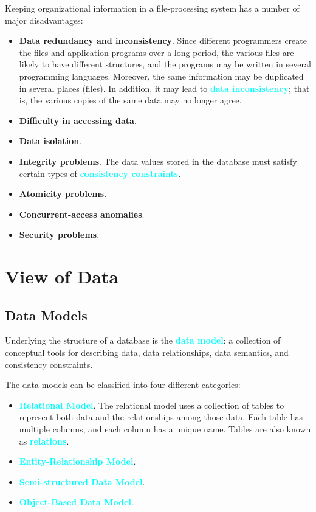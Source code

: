 \documentclass[a4paper,12pt,twoside,openany]{book}
\newcommand{\textcy}[1]{\textbf{\textcolor{cyan}{#1}}}
\begin{document}
Keeping organizational information in a file-processing system has a number of major disadvantages:
\begin{itemize}
    \item\textbf{Data redundancy and inconsistency}. Since different programmers create the files and application programs over a long period, the various files are likely to have different structures, and the programs may be written in several programming languages. Moreover, the same information may be duplicated in several places (files). In addition, it may lead to \textcy{data inconsistency}; that is, the various copies of the same data may no longer agree.
    \item\textbf{Difficulty in accessing data}.
    \item\textbf{Data isolation}.
    \item\textbf{Integrity problems}. The data values stored in the database must satisfy certain types of \textcy{consistency constraints}.
    \item\textbf{Atomicity problems}.
    \item\textbf{Concurrent-access anomalies}.
    \item\textbf{Security problems}.
\end{itemize}

\section{View of Data}
\subsection{Data Models}

Underlying the structure of a database is the \textcy{data model}: a collection of conceptual tools for describing data, data relationships, data semantics, and consistency constraints.

The data models can be classified into four different categories:
\begin{itemize}
    \item\textcy{Relational Model}. The relational model uses a collection of tables to represent both data and the relationships among those data. Each table has multiple columns, and each column has a unique name. Tables are also known as \textcy{relations}.
    \item\textcy{Entity-Relationship Model}.
    \item\textcy{Semi-structured Data Model}.
    \item\textcy{Object-Based Data Model}.
\end{itemize}
\end{document}
